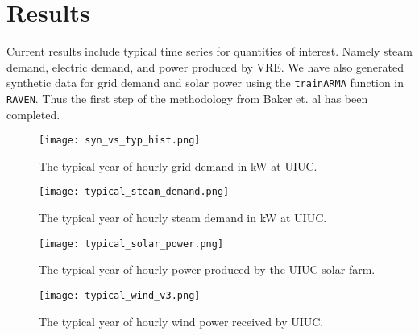 \section{Results}

Current results include typical time series for quantities of interest. Namely steam demand, electric demand, and power produced by VRE. We have also generated synthetic data for grid demand and solar power using the \texttt{trainARMA} function in \texttt{RAVEN}. Thus the first step of the methodology from Baker et. al has been completed.

\begin{figure}[H]
 	\centering
 	\label{fig:grid-demand}
 	\texttt{[image: syn\_vs\_typ\_hist.png]}
 	\caption{The typical year of hourly grid demand in kW at UIUC.}
\end{figure} 
\begin{figure}[H]
	\centering
	\label{fig:steam-demand}
	\texttt{[image: typical\_steam\_demand.png]}
	\caption{The typical year of hourly steam demand in kW at UIUC.}
\end{figure}
\begin{figure}[H]
	\centering
	\label{fig:solar-power}
	\texttt{[image: typical\_solar\_power.png]}
	\caption{The typical year of hourly power produced by the UIUC solar farm.}
\end{figure}
\begin{figure}[H]
	\centering
	\label{fig:wind-power}
	\texttt{[image: typical\_wind\_v3.png]}
	\caption{The typical year of hourly wind power received by UIUC.}
\end{figure}